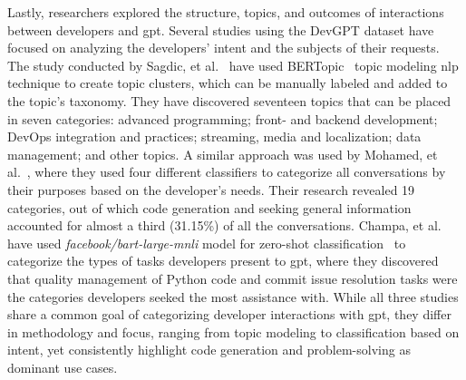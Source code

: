 Lastly, researchers explored the structure, topics, and outcomes of interactions between developers and \acrshort{gpt}. Several studies using the DevGPT dataset have focused on analyzing the developers' intent and the subjects of their requests. The study conducted by Sagdic, et al.~\cite{sagdic2024-devgpt-taxonomy} have used BERTopic~\cite{grootendorst2022bertopicneuraltopicmodeling} topic modeling \acrshort{nlp} technique to create topic clusters, which can be manually labeled and added to the topic's taxonomy. They have discovered seventeen topics that can be placed in seven categories: advanced programming; front- and backend development; DevOps integration and practices; streaming, media and localization; data management; and other topics. A similar approach was used by Mohamed, et al.~\cite{Mohamed2024-topics}, where they used four different classifiers to categorize all conversations by their purposes based on the developer's needs. Their research revealed 19 categories, out of which code generation and seeking general information accounted for almost a third (31.15\%) of all the conversations. Champa, et al.~\cite{champa2024-gpt-use} have used \textit{facebook/bart-large-mnli} model for zero-shot classification~\cite{lewis2019bartdenoisingsequencetosequencepretraining} to categorize the types of tasks developers present to \acrshort{gpt}, where they discovered that quality management of Python code and commit issue resolution tasks were the categories developers seeked the most assistance with. While all three studies share a common goal of categorizing developer interactions with \acrshort{gpt}, they differ in methodology and focus,  ranging from topic modeling to classification based on intent, yet consistently highlight code generation and problem-solving as dominant use cases.



